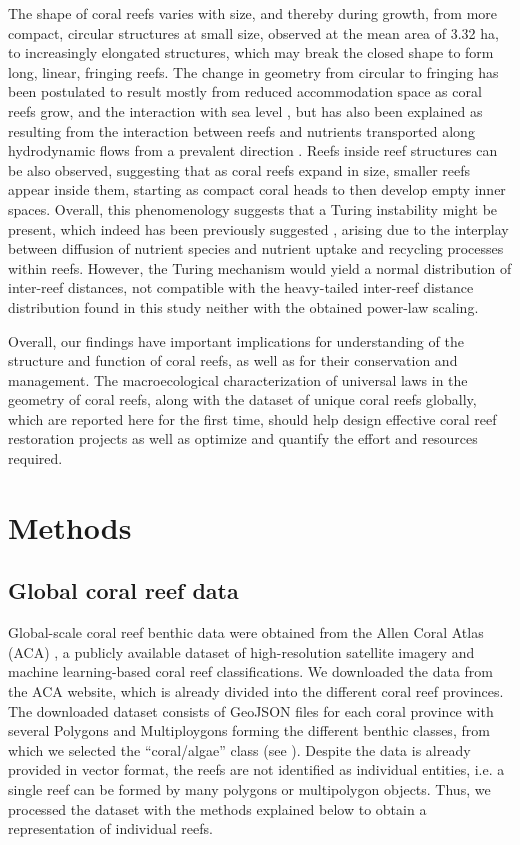 The shape of coral reefs varies with size, and thereby during growth, from
more compact, circular structures at small size, observed at the mean area of
3.32 ha, to increasingly elongated structures, which may break the closed shape
to form long, linear, fringing reefs. The change in geometry from circular to
fringing has been postulated to result mostly from reduced accommodation space
as coral reefs grow, and the interaction with sea level \cite{Kennedy2002}, but
has also been explained as resulting from the interaction between reefs and
nutrients transported along hydrodynamic flows from a prevalent direction
\cite{Mistr2003}. Reefs inside reef structures can be also observed, suggesting
that as coral reefs expand in size, smaller reefs appear inside them, starting
as compact coral heads to then develop empty inner spaces. Overall, this
phenomenology suggests that a Turing instability
\cite{turing1952chemical,CrossGreensidebook} might be present, which indeed has
been previously suggested \cite{Mistr2003}, arising due to the interplay
between diffusion of nutrient species and nutrient uptake and recycling
processes within reefs. However, the Turing mechanism would yield a normal
distribution of inter-reef distances, not compatible with the heavy-tailed
inter-reef distance distribution found in this study neither with the obtained
power-law scaling.

Overall, our findings have important implications for understanding of the
structure and function of coral reefs, as well as for their conservation and
management. The macroecological characterization of universal laws in the
geometry of coral reefs, along with the dataset of unique coral reefs globally,
which are reported here for the first time, should help design effective coral
reef restoration projects as well as optimize and quantify the effort and
resources required.

\section{Methods}

\subsection{Global coral reef data}

Global-scale coral reef benthic data were obtained from the Allen Coral
Atlas (ACA) \cite{allen-coral-atlas}, a publicly available dataset of
high-resolution satellite imagery and machine learning-based coral reef
classifications. We downloaded the data from the ACA website, which is already
divided into the different coral reef provinces. The downloaded dataset
consists of GeoJSON files for each coral province with several Polygons and
Multiploygons forming the different benthic classes, from which we selected the
``coral/algae'' class (see \cite{allen-coral-atlas}). Despite the data is
already provided in vector format, the reefs are not identified as individual
entities, i.e. a single reef can be formed by many polygons or multipolygon
objects. Thus, we processed the dataset with the methods explained below to
obtain a representation of individual reefs.

